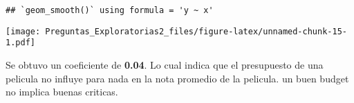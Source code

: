 \documentclass[
]{article}
\begin{document}
\begin{verbatim}
## `geom_smooth()` using formula = 'y ~ x'
\end{verbatim}

\texttt{[image: Preguntas\_Exploratorias2\_files/figure-latex/unnamed-chunk-15-1.pdf]}

Se obtuvo un coeficiente de \textbf{0.04}. Lo cual indica que el
presupuesto de una pelicula no influye para nada en la nota promedio de
la pelicula. un buen budget no implica buenas criticas.
\end{document}
